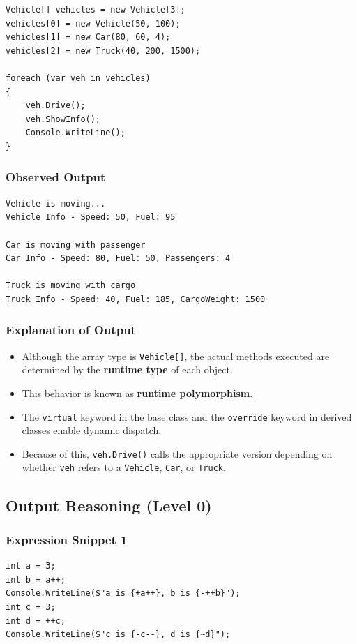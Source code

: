 \begin{lstlisting}
Vehicle[] vehicles = new Vehicle[3];
vehicles[0] = new Vehicle(50, 100);
vehicles[1] = new Car(80, 60, 4);
vehicles[2] = new Truck(40, 200, 1500);

foreach (var veh in vehicles)
{
    veh.Drive();
    veh.ShowInfo();
    Console.WriteLine();
}
\end{lstlisting}

\subsubsection{Observed Output}
\begin{verbatim}
Vehicle is moving...
Vehicle Info - Speed: 50, Fuel: 95

Car is moving with passenger
Car Info - Speed: 80, Fuel: 50, Passengers: 4

Truck is moving with cargo
Truck Info - Speed: 40, Fuel: 185, CargoWeight: 1500
\end{verbatim}

\subsubsection{Explanation of Output}
\begin{itemize}
    \item Although the array type is \texttt{Vehicle[]}, the actual methods executed are determined by the 
    \textbf{runtime type} of each object.
    \item This behavior is known as \textbf{runtime polymorphism}.
    \item The \texttt{virtual} keyword in the base class and the \texttt{override} keyword in derived 
    classes enable dynamic dispatch.
    \item Because of this, \texttt{veh.Drive()} calls the appropriate version depending on whether 
    \texttt{veh} refers to a \texttt{Vehicle}, \texttt{Car}, or \texttt{Truck}.
\end{itemize}

\subsection{Output Reasoning (Level 0)}

\subsubsection*{Expression Snippet 1}
\begin{verbatim}
int a = 3;
int b = a++;
Console.WriteLine($"a is {+a++}, b is {-++b}");
int c = 3;
int d = ++c;
Console.WriteLine($"c is {-c--}, d is {~d}");
\end{verbatim}

